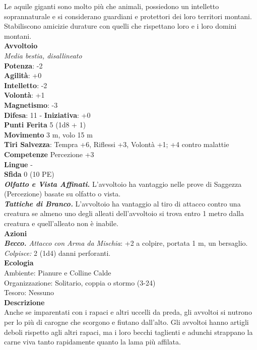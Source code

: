 \begin{multicols}{2}
Le aquile giganti sono molto più che animali, possiedono un intelletto soprannaturale e si considerano guardiani e protettori dei loro territori montani.\\

Stabiliscono amicizie durature con quelli che rispettano loro e i loro domini montani.\\

\medskip\textbf{Avvoltoio}\\
\emph{Media bestia, disallineato}\\
\textbf{Potenza}: -2\\
\textbf{Agilità}: +0\\
\textbf{Intelletto}: -2\\
\textbf{Volontà}: +1\\
\textbf{Magnetismo}: -3\\
\textbf{Difesa}: 11 - \textbf{Iniziativa}: +0\\
\textbf{Punti Ferita} 5 (1d8 + 1)\\
\textbf{Movimento} 3 m, volo 15 m\\
\textbf{Tiri Salvezza}: Tempra +6, Riflessi +3, Volontà +1; +4 contro malattie\\
\textbf{Competenze} Percezione +3\\
\textbf{Lingue} -\\
\textbf{Sfida} 0 (10 PE)\smallskip\\
\emph{\textbf{Olfatto e Vista Affinati.}} L'avvoltoio ha vantaggio nelle prove di Saggezza (Percezione) basate su olfatto o vista.\\
\emph{\textbf{Tattiche di Branco.}} L'avvoltoio ha vantaggio al tiro di attacco contro una creatura se almeno uno degli alleati dell'avvoltoio si trova entro 1 metro dalla creatura e quell'alleato non è inabile.\\
\smallskip\textbf{Azioni}\\
\emph{\textbf{Becco.} Attacco con Arma da Mischia}: +2 a colpire, portata 1 m, un bersaglio.\\
\emph{Colpisce:} 2 (1d4) danni perforanti.\\
\textbf{Ecologia}\\
Ambiente: Pianure e Colline Calde\\
Organizzazione: Solitario, coppia o stormo (3-24)\\
Tesoro: Nessuno\\
\textbf{Descrizione}\\
Anche se imparentati con i rapaci e altri uccelli da preda, gli avvoltoi si nutrono per lo più di carogne che scorgono e fiutano dall'alto. Gli avvoltoi hanno artigli deboli rispetto agli altri rapaci, ma i loro becchi taglienti e adunchi strappano la carne viva tanto rapidamente quanto la lama più affilata.\\


\end{multicols}
